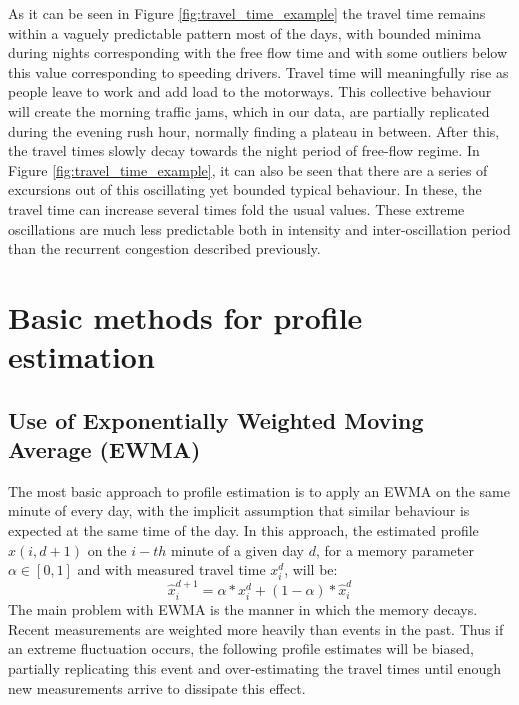 \documentclass[letterpaper, 10 pt, conference]{ieeeconf}  %
\begin{document}
As it can be seen in Figure \ref{fig:travel_time_example} the travel time remains within a vaguely predictable pattern most of the days, with bounded minima during nights corresponding with the free flow time and with some outliers below this value corresponding to speeding drivers. 
Travel time will meaningfully rise as people leave to work and add load to the motorways. 
This collective behaviour will create the morning traffic jams, which in our data, are partially replicated during the evening rush hour, normally finding a plateau in between. 
After this, the travel times slowly decay towards the night period of free-flow regime.
In Figure \ref{fig:travel_time_example}, it can also be seen that there are a series of excursions out of this oscillating yet bounded typical behaviour. 
In these, the travel time can increase several times fold the usual values.
These extreme oscillations are much less predictable both in intensity and inter-oscillation period than the recurrent congestion described previously.

\section{Basic methods for profile estimation}
\subsection{Use of Exponentially Weighted Moving Average (EWMA)} \label{ewma}
The most basic approach to profile estimation is to apply an EWMA on the same minute of every day, with the implicit assumption that similar behaviour is expected at the same time of the day. 
In this approach, the estimated profile $\hat{x}(i,d+1)$ on the $i-th$ minute of a given day $d$, for a memory parameter $\alpha \in [0,1]$ and with measured travel time $x_i^d$, will be:
\begin{equation}
\hat{x}^{d+1}_i = \alpha * x^{d}_{i} + (1-\alpha)*\hat{x}^{d}_{i}
\end{equation}
The main problem with EWMA is the manner in which the memory decays. 
Recent measurements are weighted more heavily than events in the past. Thus if an extreme fluctuation occurs,  the following profile estimates will be biased, partially replicating this event and over-estimating the travel times until enough new measurements arrive to dissipate this effect.
\end{document}
